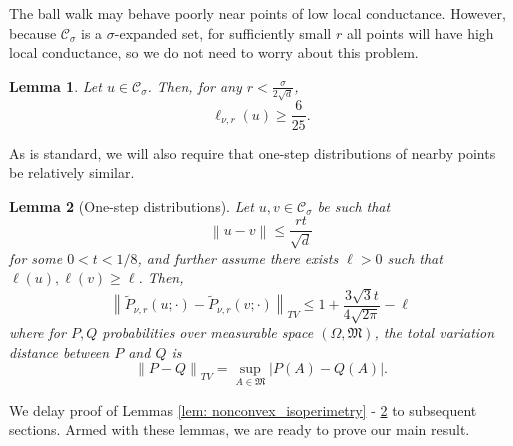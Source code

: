 \documentclass{article}
\newcommand{\norm}[1]{\left\lVert#1\right\rVert}
\newcommand{\abs}[1]{\left \lvert #1 \right \rvert}
\newcommand{\Cset}{\mathcal{C}}
\newcommand{\Csig}{\Cset_{\sigma}}
\newcommand{\1}{\mathbf{1}}
\theoremstyle{alden}
\theoremstyle{aldenthm}
\newtheorem{lemma}{Lemma}
\theoremstyle{remark}
\begin{document}
The ball walk may behave poorly near points of low local conductance. However, because $\Csig$ is a $\sigma$-expanded set, for sufficiently small $r$ all points will have high local conductance, so we do not need to worry about this problem.

\begin{lemma}
	\label{lem: local_conductance}
	Let $u \in \Csig$. Then, for any $r < \frac{\sigma}{2\sqrt{d}}$,
	\begin{equation*}
	\ell_{\nu,r}(u) \geq \frac{6}{25}.
	\end{equation*}
\end{lemma}

As is standard, we will also require that one-step distributions of nearby points be relatively similar. 

\begin{lemma}[One-step distributions]
	\label{lem: one_step_distributions}
	Let $u,v \in \Csig$ be such that 
	\begin{equation*}
	\norm{u - v} \leq \frac{r t}{\sqrt{d}}
	\end{equation*}
	for some $0 < t < 1/8$, and further assume there exists $\ell > 0$ such that $\ell(u), \ell(v) \geq \ell$. Then,
	\begin{equation*}
	\norm{\widetilde{P}_{\nu,r}(u; \cdot) - \widetilde{P}_{\nu,r}(v; \cdot)}_{TV} \leq 1 + \frac{3 \sqrt{3} t}{4\sqrt{2\pi}} - \ell
	\end{equation*}
	where for $P,Q$ probabilities over measurable space $(\Omega, \mathfrak{M})$, the total variation distance between $P$ and $Q$ is
	\begin{equation*}
	\norm{P - Q}_{TV} = \sup_{A \in \mathfrak{M}} \abs{P(A) - Q(A)}. 
	\end{equation*}
\end{lemma}

We delay proof of Lemmas \ref{lem: nonconvex_isoperimetry} - \ref{lem: one_step_distributions} to subsequent sections. Armed with these lemmas, we are ready to prove our main result.
\end{document}
